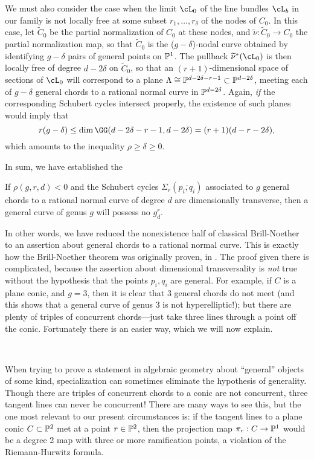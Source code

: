We must also consider the case when the limit $\cL_0$ of the line bundles $\cL_b$ in our family is not locally free at some subset $r_1, \dots, r_\delta$ of the nodes of $C_0$. In this case, let $\widetilde C_0$ be the partial normalization of $C_0$ at these nodes, and $\widetilde \nu : \widetilde C_0 \to C_0$ the partial normalization map, so that $\widetilde C_0$ is the ($g-\delta$)-nodal curve obtained by identifying $g-\delta$ pairs of general points on $\PP^1$. The pullback $\widetilde \nu^*(\cL_0)$ is then locally free of degree $d-2\delta$ on $\widetilde C_0$, so that an $(r+1)$-dimensional space of sections of $\cL_0$ will correspond to a plane $\Lambda \cong \PP^{d-2\delta-r-1} \subset \PP^{d-2\delta}$, meeting each of $g-\delta$ general chords to a rational normal curve in $\PP^{d-2\delta}$. Again, \emph{if} the corresponding Schubert cycles intersect properly, the existence of such planes would imply that
$$
r(g-\delta) \leq \dim\GG(d-2\delta-r-1,d-2\delta) = (r+1)(d-r-2\delta),
$$
which amounts to the inequality $\rho \geq \delta \geq 0$. 

In sum, we have established the 

\begin{theorem} If $\rho(g,r,d)<0$ and 
the Schubert cycles $\Sigma_r(\overline{p_i,q_i})$ associated to $g$ general chords to a rational normal curve of degree $d$ are dimensionally transverse, then a general curve of genus $g$ will possess no $g^r_d$.
\end{theorem}

In other words, we have reduced the nonexistence half of classical Brill-Noether to an assertion about general chords to a rational normal curve. This is exactly how
the Brill-Noether theorem was originally proven, in \cite{}. The proof given there is
complicated, because the assertion about dimensional transversality
is \emph{not} true without the hypothesis that the points $p_i,q_i$ are general. For example, if $C$ is a plane conic, and $g=3$, then it is clear that 3 general chords do not meet (and this shows that a general curve of genus 3 is not hyperelliptic!); but there are plenty of triples of concurrent chords---just take three lines through a point off the conic. Fortunately there is an easier way, which we will now explain.

\


When trying to prove a statement in algebraic geometry about ``general'' objects of some kind, specialization can sometimes eliminate the hypothesis of generality.
Though there are triples of concurrent chords to a conic are not concurrent, three tangent lines can never be concurrent! There are many ways to see this, but the one most relevant to our present circumstances is: if the tangent lines to a plane conic $C \subset \PP^2$ met at a point $r \in \PP^2$, then the projection map $\pi_r : C \to \PP^1$ would be a degree 2 map with three or more ramification points, a violation of the Riemann-Hurwitz formula.

